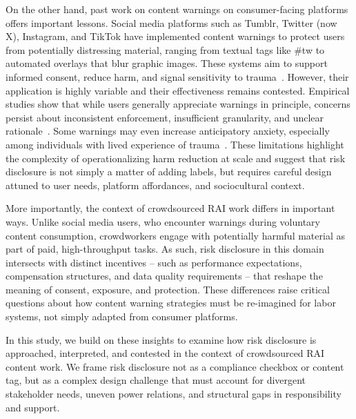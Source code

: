 On the other hand, past work on content warnings on consumer-facing platforms offers important lessons. Social media platforms such as Tumblr, Twitter (now X), Instagram, and TikTok have implemented content warnings to protect users from potentially distressing material, ranging from textual tags like \#tw to automated overlays that blur graphic images. These systems aim to support informed consent, reduce harm, and signal sensitivity to trauma~\cite{Zhang2024PerceptionsTriggerWarnings, vit2025use}. However, their application is highly variable and their effectiveness remains contested. Empirical studies show that while users generally appreciate warnings in principle, concerns persist about inconsistent enforcement, insufficient granularity, and unclear rationale~\cite{charles2022typology, bridgland2024meta, bell2025warning}. Some warnings may even increase anticipatory anxiety, especially among individuals with lived experience of trauma~\cite{sharevski2022meaningful}. These limitations highlight the complexity of operationalizing harm reduction at scale and suggest that risk disclosure is not simply a matter of adding labels, but requires careful design attuned to user needs, platform affordances, and sociocultural context.

More importantly, the context of crowdsourced RAI work differs in important ways. Unlike social media users, who encounter warnings during voluntary content consumption, crowdworkers engage with potentially harmful material as part of paid, high-throughput tasks. As such, risk disclosure in this domain intersects with distinct incentives -- such as performance expectations, compensation structures, and data quality requirements -- that reshape the meaning of consent, exposure, and protection. These differences raise critical questions about how content warning strategies must be re-imagined for labor systems, not simply adapted from consumer platforms.

In this study, we build on these insights to examine how risk disclosure is approached, interpreted, and contested in the context of crowdsourced RAI content work. We frame risk disclosure not as a compliance checkbox or content tag, but as a complex design challenge that must account for divergent stakeholder needs, uneven power relations, and structural gaps in responsibility and support.




